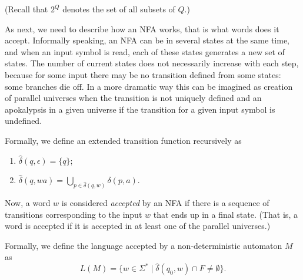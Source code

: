 (Recall that $2^Q$ denotes the set of all subsets of $Q$.)

As next, we need to describe how an NFA works, that is what words does it accept.
Informally speaking, an NFA can be in several states at the same time, and when an input symbol is read, each of these states generates a new set of states.
The number of current states does not necessarily increase with each step, because for some input there may be no transition defined from some states:
some branches die off.
In a more dramatic way this can be imagined as creation of parallel universes when the transition is not uniquely defined
and an apokalypsis in a given universe if the transition for a given input symbol is undefined.

Formally, we define an extended transition function recursively as
\begin{enumerate}
\item
$\widehat{\delta}(q, \epsilon) = \{q\}$;
\item
$\widehat{\delta}(q, wa) = \bigcup\limits_{p \in \widehat{\delta}(q,w)} \delta(p, a)$.
\end{enumerate}

Now, a word $w$ is considered \emph{accepted} by an NFA if there is a sequence of transitions corresponding to the input $w$
that ends up in a final state.
(That is, a word is accepted if it is accepted in at least one of the parallel universes.)

Formally, we define the language accepted by a non-deterministic automaton $M$ as
\begin{equation}
\label{eqn:NFALanguage}
L(M) = \{w \in \Sigma^* \mid \widehat{\delta}(q_0, w) \cap F \ne \emptyset\}.
\end{equation}

